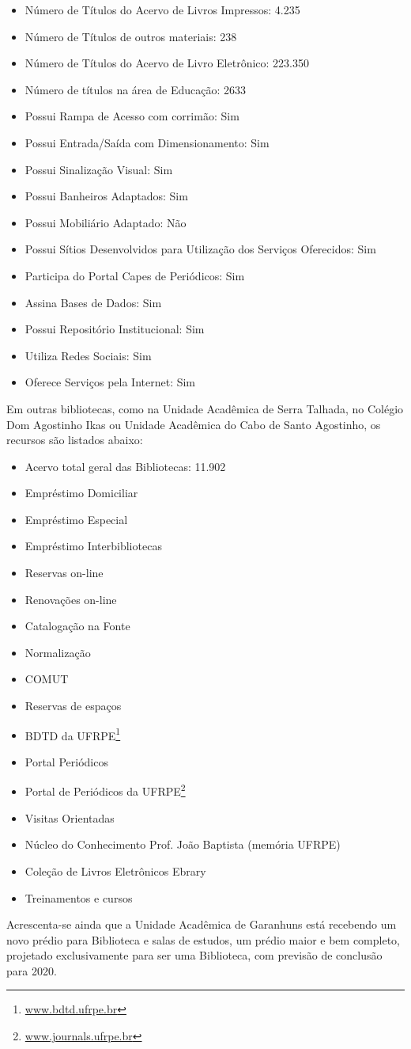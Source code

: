 \documentclass[
	12pt,				%
	openright,			%
  oneside,     %
	a4paper,			%
 hyphens,
	chapter=TITLE,		%
	english,			%
	french,				%
	spanish,			%
	brazil				%
	]{abntex2}
\begin{document}
\begin{itemize}
    \item Número de Títulos do Acervo de Livros Impressos: 4.235
    \item Número de Títulos de outros materiais: 238
    \item Número de Títulos do Acervo de Livro Eletrônico: 223.350
    \item Número de títulos na área de Educação: 2633
    \item Possui Rampa de Acesso com corrimão: Sim
    \item Possui Entrada/Saída com Dimensionamento: Sim
    \item Possui Sinalização Visual: Sim
    \item Possui Banheiros Adaptados: Sim
    \item Possui Mobiliário Adaptado: Não
    \item Possui Sítios Desenvolvidos para Utilização dos Serviços Oferecidos: Sim
    \item Participa do Portal Capes de Periódicos: Sim
    \item Assina Bases de Dados: Sim
    \item Possui Repositório Institucional: Sim
    \item Utiliza Redes Sociais: Sim
    \item Oferece Serviços pela Internet: Sim
\end{itemize}

Em outras bibliotecas, como na Unidade Acadêmica de Serra Talhada, no Colégio Dom Agostinho Ikas ou Unidade Acadêmica do Cabo de Santo Agostinho, os recursos são listados abaixo:

\begin{itemize}
    \item Acervo total geral das Bibliotecas: 11.902
    \item Empréstimo Domiciliar
    \item Empréstimo Especial
    \item Empréstimo Interbibliotecas
    \item Reservas on-line
    \item Renovações on-line
    \item Catalogação na Fonte
    \item Normalização
    \item COMUT
    \item Reservas de espaços
    \item BDTD da UFRPE\footnote{\url{www.bdtd.ufrpe.br}}
    \item Portal Periódicos
    \item Portal de Periódicos da UFRPE\footnote{\url{www.journals.ufrpe.br}}
    \item Visitas Orientadas
    \item Núcleo do Conhecimento Prof. João Baptista (memória UFRPE)
    \item Coleção de Livros Eletrônicos Ebrary
    \item Treinamentos e cursos
\end{itemize}

Acrescenta-se ainda que a Unidade Acadêmica de Garanhuns está recebendo um novo prédio para Biblioteca e salas de estudos, um prédio maior e bem completo, projetado exclusivamente para ser uma Biblioteca, com previsão de conclusão para 2020.




\end{document}
